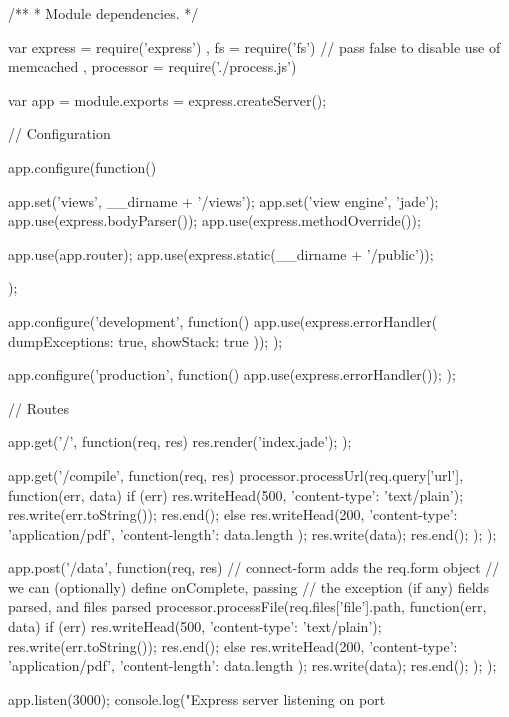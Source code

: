 
/**
 * Module dependencies.
 */

var express = require('express')
  , fs = require('fs')
  // pass false to disable use of memcached
  , processor = require('./process.js')

var app = module.exports = express.createServer();

// Configuration

app.configure(function(){
  app.set('views', __dirname + '/views');
  app.set('view engine', 'jade');
  app.use(express.bodyParser());
  app.use(express.methodOverride());

  app.use(app.router);
  app.use(express.static(__dirname + '/public'));
});

app.configure('development', function(){
  app.use(express.errorHandler({ dumpExceptions: true, showStack: true }));
});

app.configure('production', function(){
  app.use(express.errorHandler());
});

// Routes

app.get('/', function(req, res) {
    res.render('index.jade');
});

app.get('/compile', function(req, res) {
    processor.processUrl(req.query['url'], function(err, data) {
        if (err) {
            res.writeHead(500, {'content-type': 'text/plain'});
            res.write(err.toString());
            res.end();
        } else {
            res.writeHead(200, {
                'content-type': 'application/pdf',
                'content-length': data.length
            });
            res.write(data);
            res.end();
        }
    });
});

app.post('/data', function(req, res) {
     // connect-form adds the req.form object
  // we can (optionally) define onComplete, passing
  // the exception (if any) fields parsed, and files parsed
    processor.processFile(req.files['file'].path, function(err, data) {
        if (err) {
            res.writeHead(500, {'content-type': 'text/plain'});
            res.write(err.toString());
            res.end();
        } else {
            res.writeHead(200, {
                'content-type': 'application/pdf',
                'content-length': data.length
            });
            res.write(data);
            res.end();
        }
    });
});


app.listen(3000);
console.log("Express server listening on port %

